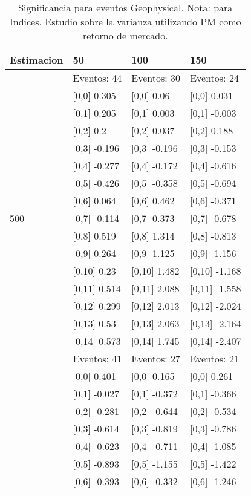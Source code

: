 \begin{table}

\caption{Significancia para eventos Geophysical. Nota: para Indices. Estudio sobre la varianza utilizando PM como retorno de mercado.}
\centering
\begin{tabular}[t]{llll}
\toprule
Estimacion & 50 & 100 & 150\\
\midrule
 & Eventos:  44 & Eventos:  30 & Eventos:  24\\
 & {}[0,0] 0.305 & {}[0,0] 0.06 & {}[0,0] 0.031\\
 & {}[0,1] 0.205 & {}[0,1] 0.003 & {}[0,1] -0.003\\
 & {}[0,2] 0.2 & {}[0,2] 0.037 & {}[0,2] 0.188\\
 & {}[0,3] -0.196 & {}[0,3] -0.196 & {}[0,3] -0.153\\
\addlinespace
 & {}[0,4] -0.277 & {}[0,4] -0.172 & {}[0,4] -0.616\\
 & {}[0,5] -0.426 & {}[0,5] -0.358 & {}[0,5] -0.694\\
 & {}[0,6] 0.064 & {}[0,6] 0.462 & {}[0,6] -0.371\\
500 & {}[0,7] -0.114 & {}[0,7] 0.373 & {}[0,7] -0.678\\
 & {}[0,8] 0.519 & {}[0,8] 1.314 & {}[0,8] -0.813\\
\addlinespace
 & {}[0,9] 0.264 & {}[0,9] 1.125 & {}[0,9] -1.156\\
 & {}[0,10] 0.23 & {}[0,10] 1.482 & {}[0,10] -1.168\\
 & {}[0,11] 0.514 & {}[0,11] 2.088 & {}[0,11] -1.558\\
 & {}[0,12] 0.299 & {}[0,12] 2.013 & {}[0,12] -2.024\\
 & {}[0,13] 0.53 & {}[0,13] 2.063 & {}[0,13] -2.164\\
\addlinespace
 & {}[0,14] 0.573 & {}[0,14] 1.745 & {}[0,14] -2.407\\
 & Eventos:  41 & Eventos:  27 & Eventos:  21\\
 & {}[0,0] 0.401 & {}[0,0] 0.165 & {}[0,0] 0.261\\
 & {}[0,1] -0.027 & {}[0,1] -0.372 & {}[0,1] -0.366\\
 & {}[0,2] -0.281 & {}[0,2] -0.644 & {}[0,2] -0.534\\
\addlinespace
 & {}[0,3] -0.614 & {}[0,3] -0.819 & {}[0,3] -0.786\\
 & {}[0,4] -0.623 & {}[0,4] -0.711 & {}[0,4] -1.085\\
 & {}[0,5] -0.893 & {}[0,5] -1.155 & {}[0,5] -1.422\\
 & {}[0,6] -0.393 & {}[0,6] -0.332 & {}[0,6] -1.246\\

\end{tabular}
\end{table}
